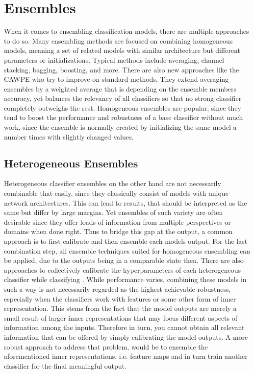 \section{Ensembles}
\label{sec:ensembles}

When it comes to ensembling classification models, there are multiple approaches to do so. Many ensembling methods are focused on combining homogeneous 
models, meaning a set of related models with similar architecture but different parameters or initializations. Typical methods \cite{Opitz_1999ensemblebasics} include 
averaging, channel stacking, bagging, boosting, and more. There are also new approaches like the CAWPE \cite{Large_2019CAPE} who try to improve on standard methods. They extend averaging ensembles by 
a weighted average that is depending on the ensemble members accuracy, yet balances the relevancy of all classifiers so that no strong classifier completely outweighs the rest.\newline
Homogeneous ensembles are popular, since they tend to boost the performance and robustness of a base classifier without 
much work, since the ensemble is normally created by initializing the same model a number times with slightly changed values.

\subsection{Heterogeneous Ensembles}

Heterogeneous classifier ensembles on the other hand are not necessarily combinable that easily, since they classically consist of models with 
unique network architectures. This can lead to results, that should be interpreted as the same but differ by large margins. Yet 
ensembles of such variety are often desirable since they offer loads of information from multiple perspectives or domains when done right. 
\newline
Thus to bridge this gap at the output, a common approach is to first calibrate \cite{Guo_2017_tempscalingetc} and then ensemble each models 
output. For the last combination step, all ensemble techniques suited for homogeneous ensembling can 
be applied, due to the outputs being in a comparable state then. There are also approaches to collectively calibrate the hyperparameters 
of each heterogeneous classifier while classifying \cite{Guo_2017_tempscalingetc}. While performance varies, combining 
these models in such a way is not necessarily regarded as the highest achievable robustness, especially when the classifiers work with features or some other form of inner representation. 
This stems from the fact that the model outputs are merely a small result of larger inner representations that may focus different aspects 
of information among the inputs. Therefore in turn, you cannot obtain all relevant information that can be offered by simply calibrating the 
model outputs. A more robust approach to address that problem, would be to ensemble the aforementioned inner representations, i.e. feature maps 
and in turn train another classifier for the final meaningful output.

